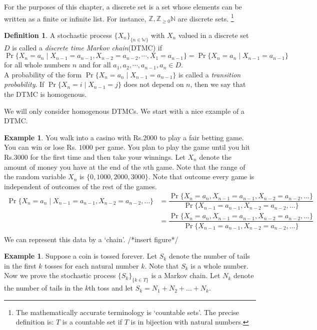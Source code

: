 \documentclass[letterpaper, 12pt]{article}
\newcommand{\1}{\mathds{1}} %
\theoremstyle{definition}
\newtheorem{definition}[theorem]{Definition}
\newtheorem{example}[theorem]{Example}
\begin{document}
For the purposes of this chapter, a discrete set is a set whose elements can be written as a finite or infinite list. For instance, $\mathbb{Z},\mathbb{Z}_{\geq 0}\mathbb{N}$ are discrete sets. \footnote{The mathematically accurate terminology is `countable sets'. The precise definition is: $T$ is a countable set if $T$ is in bijection with natural numbers.}

\begin{definition}
  \label{defn:DTMC}
A stochastic process $\{X_n\}_{\{n \in \mathbb{W}\}}$ with $X_n$ valued in a discrete set $D$ is called a \textit{discrete time Markov chain}(DTMC) if \[\Pr\{X_n=a_n\mid X_{n-1}=a_{n-1},X_{n-2}=a_{n-2},\cdots,X_{1}=a_{n-1}\} = \Pr\{X_n =a_n \mid X_{n-1}=a_{n-1}\}\]for all whole numbers $n$ and for all $a_1,a_2,\cdots,a_{n-1},a_n\in D$.\\
A probability of the form $\Pr\{X_n =a_n \mid X_{n-1}=a_{n-1}\}$ is called a \textit{transition probability}. If $\Pr\{X_n =i \mid X_{n-1}=j\}$ does not depend on $n$, then we say that the DTMC is homogenous. 
\end{definition}


We will only consider homogenous DTMCs. We start with a nice example of a DTMC.
\begin{example}
You walk into a casino with Rs.$2000$ to play a fair betting game. You can win or lose Rs. $1000$ per game. You plan to play the game until you hit Rs.$3000$ for the first time and then take your winnings. Let $X_n$ denote the amount of money you have at the end of the $n$th game. Note that the range of the random variable $X_n$ is $\{0,1000,2000,3000\}$. Note that outcome every game is independent of outcomes of the rest of the games.
\begin{align*}
\Pr\{X_n = a_n \mid X_{n-1}=a_{n-1},X_{n-2}=a_{n-2},\ldots\} &= \dfrac{\Pr\{X_n = a_n, X_{n-1}=a_{n-1},X_{n-2}=a_{n-2},\ldots\}}{\Pr\{X_{n-1} = a_{n-1},X_{n-2}=a_{n-2},\ldots\}}\\
&= \dfrac{\Pr\{X_n = a_n, X_{n-1}=a_{n-1},X_{n-2}=a_{n-2},\ldots\}}{\Pr\{X_{n-1} = a_{n-1},X_{n-2}=a_{n-2},\ldots\}}\\
\end{align*}
We can represent this data by a `chain'.
/*insert figure*/
\end{example}


\begin{example}
  \label{exmpl:DTMCcointoss}
Suppose a coin is tossed forever. Let $S_k$ denote the number of tails in the first $k$ tosses for each natural number $k$. Note that $S_k$ is a whole number. Now we prove the stochastic process $\{S_k\}_{\{k \in T\}}$ is a Markov chain.
Let $N_k$ denote the number of tails in the $k$th toss and let $S_k = N_1 + N_2 + \ldots + N_k$.
\end{example}
\end{document}

